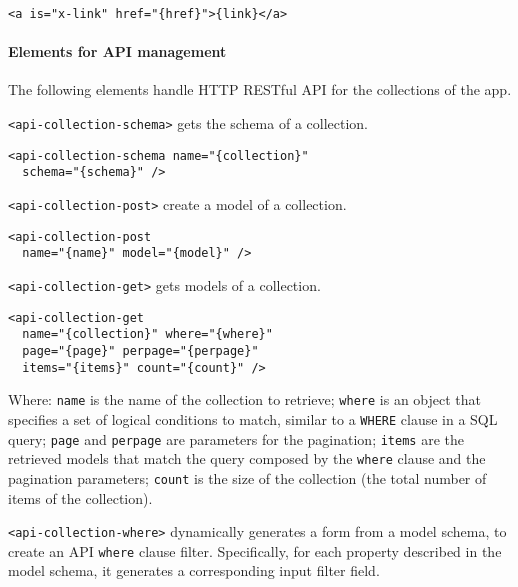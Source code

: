 \begin{lstlisting}[language=HTML5]
<a is="x-link" href="{href}">{link}</a>
\end{lstlisting}

\paragraph{Elements for API management}

The following elements handle HTTP RESTful API for the collections of the app.

\texttt{<api-collection-schema>} gets the schema of a collection. 

\begin{lstlisting}[language=HTML5]
<api-collection-schema name="{collection}" 
  schema="{schema}" />
\end{lstlisting}

\vspace{0.2cm}

\texttt{<api-collection-post>} create a model of a collection. 

\begin{lstlisting}[language=HTML5]
<api-collection-post 
  name="{name}" model="{model}" />
\end{lstlisting}

\vspace{0.2cm}

\texttt{<api-collection-get>} gets models of a collection. 

\begin{lstlisting}[language=HTML5]
<api-collection-get 
  name="{collection}" where="{where}" 
  page="{page}" perpage="{perpage}"  
  items="{items}" count="{count}" />
\end{lstlisting}

Where: 
\texttt{name} is the name of the collection to retrieve; 
\texttt{where} is an object that specifies a set of logical conditions to match, similar to a \texttt{WHERE} clause in a SQL query;
\texttt{page} and \texttt{perpage} are parameters for the pagination;
\texttt{items} are the retrieved models that match the query composed by the \texttt{where} clause and the pagination parameters;
\texttt{count} is the size of the collection (the total number of items of the collection).

\vspace{0.2cm}

\texttt{<api-collection-where>} dynamically generates a form from a model schema, to create an API \texttt{where} clause filter. Specifically, for each property described in the model schema, it generates a corresponding input filter field. 

